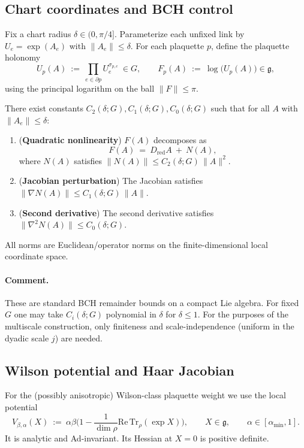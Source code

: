 \subsection{Chart coordinates and BCH control}

Fix a chart radius $\delta\in(0,\pi/4]$. Parameterize each unfixed link by $U_e=\exp(A_e)$ with $\|A_e\|\le\delta$.
For each plaquette $p$, define the plaquette holonomy
\[
U_p(A)\ :=\ \prod_{e\in\partial p} U_e^{\sigma_{p,e}}\ \in G,
\qquad
F_p(A)\ :=\ \log\big(U_p(A)\big)\in\mathfrak g,
\]
using the principal logarithm on the ball $\|F\|\le \pi$.

\begin{lemma}\label{lem:BCH_bounds}
There exist constants $C_2(\delta;G),C_1(\delta;G),C_0(\delta;G)$ such that for all $A$ with $\|A_e\|\le \delta$:
\begin{enumerate}[label=(B\arabic*)]
\item (\textbf{Quadratic nonlinearity}) $F(A)$ decomposes as
\begin{equation}\label{eq:F_decomp}
F(A)\ =\ D_{\mathrm{red}}A\ +\ N(A),
\end{equation}
where $N(A)$ satisfies $\|N(A)\|\le C_2(\delta;G)\,\|A\|^2$.
\item (\textbf{Jacobian perturbation}) The Jacobian satisfies $\|\nabla N(A)\|\le C_1(\delta;G)\,\|A\|$.
\item (\textbf{Second derivative}) The second derivative satisfies $\|\nabla^2 N(A)\|\le C_0(\delta;G)$.
\end{enumerate}
All norms are Euclidean/operator norms on the finite-dimensional local coordinate space.
\end{lemma}

\paragraph{Comment.}
These are standard BCH remainder bounds on a compact Lie algebra.
For fixed $G$ one may take $C_i(\delta;G)$ polynomial in $\delta$ for $\delta\le 1$.
For the purposes of the multiscale construction, only finiteness and scale-independence (uniform in the dyadic scale $j$) are needed.

\subsection{Wilson potential and Haar Jacobian}

For the (possibly anisotropic) Wilson-class plaquette weight we use the local potential
\[
V_{\beta,\alpha}(X)\ :=\ \alpha\beta\Big(1-\frac{1}{\dim\rho}\mathrm{Re\,Tr}_{\rho}(\exp X)\Big),
\qquad X\in\mathfrak g,\qquad \alpha\in[\alpha_{\min},1].
\]
It is analytic and Ad-invariant. Its Hessian at $X=0$ is positive definite.

